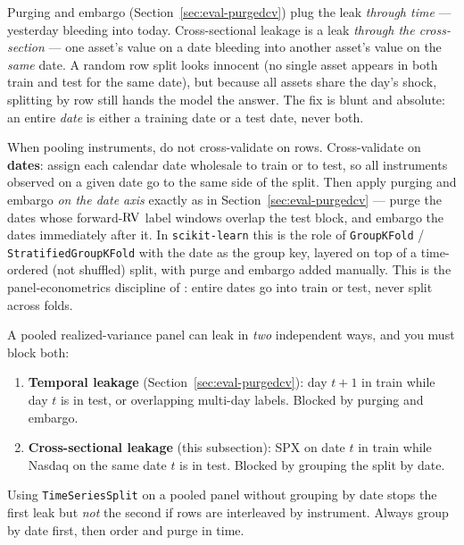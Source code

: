 \begin{intuition}
Purging and embargo (Section~\ref{sec:eval-purgedcv}) plug the leak \emph{through time} --- yesterday bleeding into today.
Cross-sectional leakage is a leak \emph{through the cross-section} --- one asset's value on a date bleeding into another asset's value on the \emph{same} date.
A random row split looks innocent (no single asset appears in both train and test for the same date), but because all assets share the day's shock, splitting by row still hands the model the answer.
The fix is blunt and absolute: an entire \emph{date} is either a training date or a test date, never both.
\end{intuition}

\begin{keyidea}
When pooling instruments, do not cross-validate on rows.
Cross-validate on \textbf{dates}: assign each calendar date wholesale to train or to test, so all instruments observed on a given date go to the same side of the split.
Then apply purging and embargo \emph{on the date axis} exactly as in Section~\ref{sec:eval-purgedcv} --- purge the dates whose forward-$\operatorname{RV}$ label windows overlap the test block, and embargo the dates immediately after it.
In \texttt{scikit-learn} this is the role of \texttt{GroupKFold} / \texttt{StratifiedGroupKFold} with the date as the group key, layered on top of a time-ordered (not shuffled) split, with purge and embargo added manually.
This is the panel-econometrics discipline of \citet{LopezdePrado2018}: entire dates go into train or test, never split across folds.
\end{keyidea}

\begin{warning}
A pooled realized-variance panel can leak in \emph{two} independent ways, and you must block both:
\begin{enumerate}[nosep]
  \item \textbf{Temporal leakage} (Section~\ref{sec:eval-purgedcv}): day $t{+}1$ in train while day $t$ is in test, or overlapping multi-day labels. Blocked by purging and embargo.
  \item \textbf{Cross-sectional leakage} (this subsection): SPX on date $t$ in train while Nasdaq on the same date $t$ is in test. Blocked by grouping the split by date.
\end{enumerate}
Using \texttt{TimeSeriesSplit} on a pooled panel without grouping by date stops the first leak but \emph{not} the second if rows are interleaved by instrument. Always group by date first, then order and purge in time.
\end{warning}

